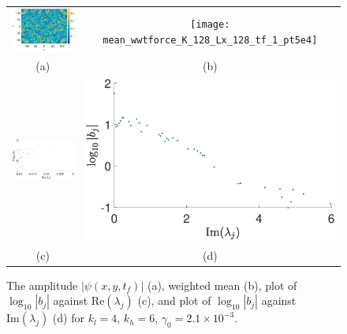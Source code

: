 \documentclass[a4paper,11pt]{article}
\begin{document}
\begin{figure}[!ht]
\centering
\begin{tabular}{cc}
\includegraphics[width=.525\textwidth]{amplitude_wwt_K_128_Lx_128_tf_1pt5e4} &\hspace{-25pt} \texttt{[image: mean\_wwtforce\_K\_128\_Lx\_128\_tf\_1\_pt5e4]} \\
(a) & (b)\\
\includegraphics[width=.525\textwidth]{bvals_vs_real_lam_wwtforce_K_128_Lx_128_tf_1_pt5e4} &\hspace{-25pt} \includegraphics[width=.525\textwidth]{bvals_vs_imag_lam_wwtforce_K_128_Lx_128_tf_1_pt5e4}\\
(c) & (d)
\end{tabular}
\caption{The amplitude $\left|\psi(x,y,t_{f})\right|$ (a), weighted mean (b),  plot of $\log_{10}|b_{j}|$ against $\mbox{Re}(\lambda_{j})$ (c), and plot of $\log_{10}|b_{j}|$ against $\mbox{Im}(\lambda_{j})$ (d) for $k_{l}=4$, $k_{h}=6$, $\gamma_{0}=2.1\times 10^{-3}$. }
\label{fig:ampcompwwt}
\end{figure}
\end{document}

